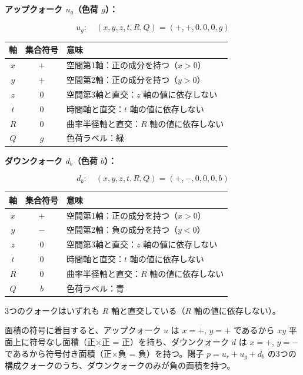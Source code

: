 \documentclass[
  a4paper,11pt]{ltjsarticle}
\newcounter{none}
\theoremstyle{definition}
\theoremstyle{remark}
\begin{document}
\textbf{アップクォーク \(u_g\)（色荷 \(g\)）：}

\[u_g: \quad (x, y, z, t, R, Q) = (+, +, 0, 0, 0, g)\]

{\def\LTcaptype{none} %
\begin{longtable}[]{@{}ccl@{}}
\toprule\noalign{}
軸 & 集合符号 & 意味 \\
\midrule\noalign{}
\endhead
\bottomrule\noalign{}
\endlastfoot
\(x\) & \(+\) & 空間第1軸：正の成分を持つ（\(x > 0\)） \\
\(y\) & \(+\) & 空間第2軸：正の成分を持つ（\(y > 0\)） \\
\(z\) & \(0\) & 空間第3軸と直交：\(z\) 軸の値に依存しない \\
\(t\) & \(0\) & 時間軸と直交：\(t\) 軸の値に依存しない \\
\(R\) & \(0\) & 曲率半径軸と直交：\(R\) 軸の値に依存しない \\
\(Q\) & \(g\) & 色荷ラベル：緑 \\
\end{longtable}
}

\textbf{ダウンクォーク \(d_b\)（色荷 \(b\)）：}

\[d_b: \quad (x, y, z, t, R, Q) = (+, -, 0, 0, 0, b)\]

{\def\LTcaptype{none} %
\begin{longtable}[]{@{}ccl@{}}
\toprule\noalign{}
軸 & 集合符号 & 意味 \\
\midrule\noalign{}
\endhead
\bottomrule\noalign{}
\endlastfoot
\(x\) & \(+\) & 空間第1軸：正の成分を持つ（\(x > 0\)） \\
\(y\) & \(-\) & 空間第2軸：負の成分を持つ（\(y < 0\)） \\
\(z\) & \(0\) & 空間第3軸と直交：\(z\) 軸の値に依存しない \\
\(t\) & \(0\) & 時間軸と直交：\(t\) 軸の値に依存しない \\
\(R\) & \(0\) & 曲率半径軸と直交：\(R\) 軸の値に依存しない \\
\(Q\) & \(b\) & 色荷ラベル：青 \\
\end{longtable}
}

3つのクォークはいずれも \(R\) 軸と直交している（\(R\)
軸の値に依存しない）。

面積の符号に着目すると、アップクォーク \(u\) は \(x = +\), \(y = +\)
であるから \(xy\) 平面上に符号なし面積（正×正 =
正）を持ち、ダウンクォーク \(d\) は \(x = +\), \(y = -\)
であるから符号付き面積（正×負 = 負）を持つ。陽子 \(p = u_r + u_g + d_b\)
の3つの構成クォークのうち、ダウンクォークのみが負の面積を持つ。
\end{document}

